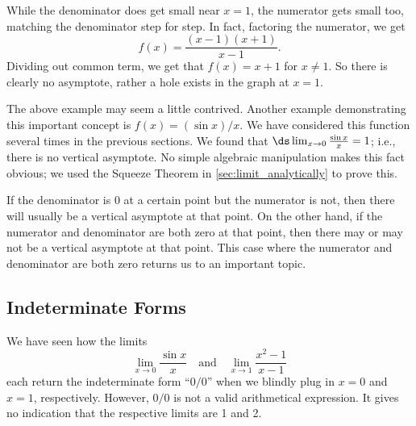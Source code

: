 While the denominator does get small near $x=1$, the numerator gets small too, matching the denominator step for step. In fact, factoring the numerator, we get
\[f(x)=\frac{(x-1)(x+1)}{x-1}.\]
Dividing out common term, we get that $f(x)=x+1$ for $x\not=1$.   So there is clearly no asymptote, rather a hole exists in the graph at $x=1$.\bigskip

The above example may seem a little contrived.  Another example demonstrating this important concept is $f(x)= (\sin x)/x$. We have considered this function several times in the previous sections. We found that $\ds \lim_{x\to0}\frac{\sin x}{x}=1$; i.e., there is no vertical asymptote. No simple algebraic manipulation makes this fact obvious; we used the Squeeze Theorem in \autoref{sec:limit_analytically} to prove this.\bigskip

If the denominator is 0 at a certain point but the numerator is not, then there will usually be a vertical asymptote at that point. On the other hand, if the numerator and denominator are both zero at that point, then there may or may not be a vertical asymptote at that point.  This case where the numerator and denominator are both zero returns us to an important topic.

\subsection{Indeterminate Forms}

We have seen how the limits 
\[\lim_{x\rightarrow 0}\frac{\sin x}{x}\quad \text{and}\quad \lim_{x\to1}\frac{x^2-1}{x-1}\]
each return the indeterminate form ``$0/0$'' when we blindly plug in $x=0$ and $x=1$, respectively. However, $0/0$ is not a valid arithmetical expression. It gives no indication that the respective limits are 1 and 2.%


